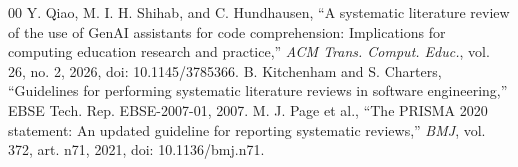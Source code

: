 \documentclass[conference]{IEEEtran}
\begin{document}
\begin{thebibliography}{00}
 Y. Qiao, M. I. H. Shihab, and C. Hundhausen, ``A systematic literature review of the use of GenAI assistants for code comprehension: Implications for computing education research and practice,'' \textit{ACM Trans. Comput. Educ.}, vol. 26, no. 2, 2026, doi: 10.1145/3785366.
 B. Kitchenham and S. Charters, ``Guidelines for performing systematic literature reviews in software engineering,'' EBSE Tech. Rep. EBSE-2007-01, 2007.
 M. J. Page et al., ``The PRISMA 2020 statement: An updated guideline for reporting systematic reviews,'' \textit{BMJ}, vol. 372, art. n71, 2021, doi: 10.1136/bmj.n71.
\end{thebibliography}
\end{document}
